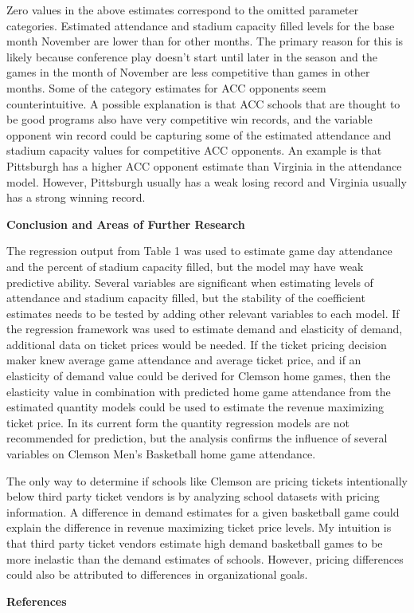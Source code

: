 \documentclass[preprint,12pt,times]{elsarticle}
\begin{document}
Zero values in the above estimates correspond to the omitted parameter categories.  Estimated attendance and stadium capacity filled levels for the base month November are lower than for other months.  The primary reason for this is likely because conference play doesn't start until later in the season and the games in the month of November are less competitive than games in other months.  Some of the category estimates for ACC opponents seem counterintuitive.  A possible explanation is that ACC schools that are thought to be good programs also have very competitive win records, and the variable opponent win record could be capturing some of the estimated attendance and stadium capacity values for competitive ACC opponents.  An example is that Pittsburgh has a higher ACC opponent estimate than Virginia in the attendance model.  However, Pittsburgh usually has a weak losing record and Virginia usually has a strong winning record.
\newpage
\begin{large}
\noindent\textbf{Conclusion and Areas of Further Research}
\end{large}

The regression output from Table 1 was used to estimate game day attendance and the percent of stadium capacity filled, but the model may have weak predictive ability.  Several variables are significant when estimating levels of attendance and stadium capacity filled, but the stability of the coefficient estimates needs to be tested by adding other relevant variables to each model.  If the regression framework was used to estimate demand and elasticity of demand, additional data on ticket prices would be needed.  If the ticket pricing decision maker knew average game attendance and average ticket price, and if an elasticity of demand value could be derived for Clemson home games, then the elasticity value in combination with predicted home game attendance from the estimated quantity models could be used to estimate the revenue maximizing ticket price.  In its current form the quantity regression models are not recommended for prediction, but the analysis confirms the influence of several variables on Clemson Men's Basketball home game attendance.

The only way to determine if schools like Clemson are pricing tickets intentionally below third party ticket vendors is by analyzing school datasets with pricing information.  A difference in demand estimates for a given basketball game could explain the difference in revenue maximizing ticket price levels.  My intuition is that third party ticket vendors estimate high demand basketball games to be more inelastic than the demand estimates of schools. However, pricing differences could also be attributed to differences in organizational goals.
\newpage
\noindent
\begin{Large}
\textbf{References}
\end{Large}\\
\end{document}
